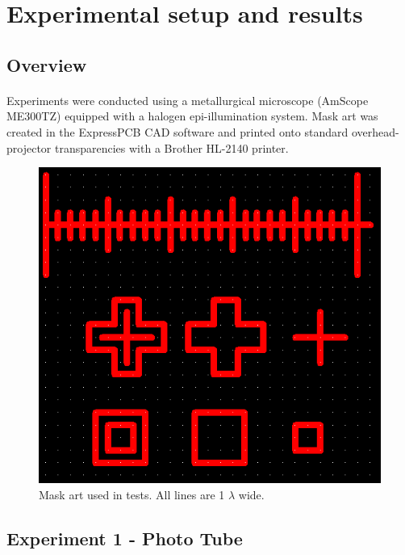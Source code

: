 \documentclass[twocolumn]{article}
\begin{document}
\section{Experimental setup and results}

\subsection{Overview}
\paragraph*{}
Experiments were conducted using a metallurgical microscope (AmScope ME300TZ) equipped with a halogen epi-illumination
system. Mask art was created in the ExpressPCB CAD software and printed onto standard overhead-projector transparencies
with a Brother HL-2140 printer.

\begin{figure}[h]
\begin{center}
\includegraphics[scale=0.25]{mask-art.png}
\end{center}
\caption{Mask art used in tests. All lines are 1 $\lambda$ wide.}
\label{mask-art}
\end{figure}

\subsection{Experiment 1 - Photo Tube}
\end{document}
